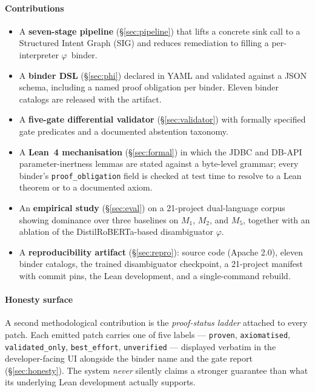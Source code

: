 \documentclass[conference]{IEEEtran}
\newcommand{\sig}{\textsc{SIG}}
\newcommand{\phisig}{\ensuremath{\varphi}}
\begin{document}
\paragraph*{Contributions}
\begin{itemize}[leftmargin=*]
  \item A \textbf{seven-stage pipeline} (\S\ref{sec:pipeline}) that
        lifts a concrete sink call to a Structured Intent Graph
        (\sig) and reduces remediation to filling a per-interpreter
        $\phisig$~binder.
  \item A \textbf{binder DSL} (\S\ref{sec:phi}) declared in YAML and
        validated against a JSON schema, including a named proof
        obligation per binder.  Eleven binder catalogs are released
        with the artifact.
  \item A \textbf{five-gate differential validator}
        (\S\ref{sec:validator}) with formally specified gate
        predicates and a documented abstention taxonomy.
  \item A \textbf{Lean~4 mechanisation} (\S\ref{sec:formal}) in which
        the JDBC and DB-API parameter-inertness lemmas are stated
        against a byte-level grammar; every binder's
        \texttt{proof\_obligation} field is checked at test time to
        resolve to a Lean theorem or to a documented axiom.
  \item An \textbf{empirical study} (\S\ref{sec:eval}) on a 21-project
        dual-language corpus showing dominance over three baselines
        on $M_1$, $M_2$, and $M_5$, together with an ablation of the
        DistilRoBERTa-based disambiguator $\phisig$.
  \item A \textbf{reproducibility artifact} (\S\ref{sec:repro}):
        source code (Apache 2.0), eleven binder catalogs, the trained
        disambiguator checkpoint, a 21-project manifest with commit
        pins, the Lean development, and a single-command rebuild.
\end{itemize}

\paragraph*{Honesty surface}
A second methodological contribution is the \emph{proof-status
ladder} attached to every patch. Each emitted patch carries one of
five labels --- \texttt{proven}, \texttt{axiomatised},
\texttt{validated\_only}, \texttt{best\_effort}, \texttt{unverified}
--- displayed verbatim in the developer-facing UI alongside the
binder name and the gate report (\S\ref{sec:honesty}). The system
\emph{never} silently claims a stronger guarantee than what its
underlying Lean development actually supports.
\end{document}
